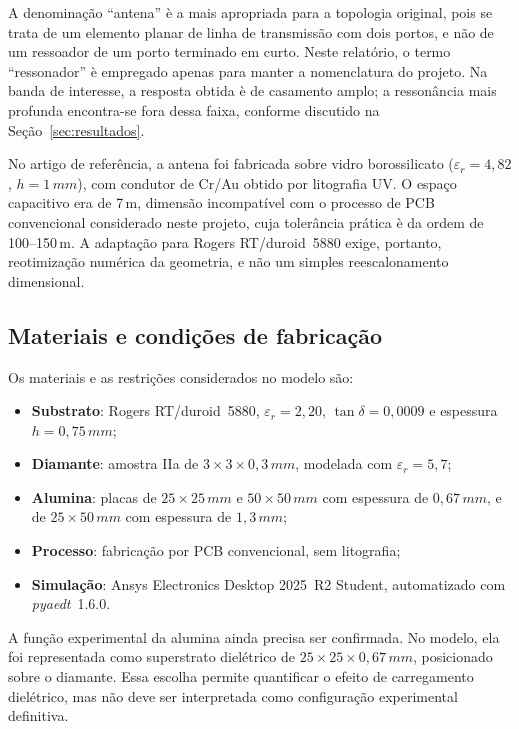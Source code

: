\documentclass[10pt,a4paper,twocolumn]{article}
\begin{document}
A denomina\c{c}\~ao ``antena'' \`e a mais apropriada para a topologia
original, pois se trata de um elemento planar de linha de transmiss\~ao
com dois portos, e n\~ao de um ressoador de um porto terminado em curto.
Neste relat\'orio, o termo ``ressonador'' \`e empregado apenas para
manter a nomenclatura do projeto. Na banda de interesse, a resposta
obtida \`e de casamento amplo; a resson\^ancia mais profunda encontra-se
fora dessa faixa, conforme discutido na Se\c{c}\~ao~\ref{sec:resultados}.

No artigo de refer\^encia, a antena foi fabricada sobre vidro
borossilicato ($\varepsilon_r=4,82$, $h=1\,mm$), com condutor de Cr/Au
obtido por litografia UV. O espa\c{c}o capacitivo era de
7\,\textmu m, dimens\~ao incompat\'ivel com o processo de PCB
convencional considerado neste projeto, cuja toler\^ancia pr\'atica \`e
da ordem de 100--150\,\textmu m. A adapta\c{c}\~ao para Rogers
RT/duroid~5880 exige, portanto, reotimiza\c{c}\~ao num\'erica da
geometria, e n\~ao um simples reescalonamento dimensional.

\subsection{Materiais e condi\c{c}\~oes de fabrica\c{c}\~ao}

Os materiais e as restri\c{c}\~oes considerados no modelo s\~ao:

\begin{itemize}
	\item \textbf{Substrato}: Rogers RT/duroid~5880,
	$\varepsilon_r=2,20$, $\tan\delta=0,0009$ e espessura
	$h=0,75\,mm$;
	\item \textbf{Diamante}: amostra IIa de
	$3\times3\times0,3\,mm$, modelada com $\varepsilon_r=5,7$;
	\item \textbf{Alumina}: placas de $25\times25\,mm$ e
	$50\times50\,mm$ com espessura de $0,67\,mm$, e de
	$25\times50\,mm$ com espessura de $1,3\,mm$;
	\item \textbf{Processo}: fabrica\c{c}\~ao por PCB convencional,
	sem litografia;
	\item \textbf{Simula\c{c}\~ao}: Ansys Electronics Desktop 2025~R2
	Student, automatizado com \emph{pyaedt}~1.6.0.
\end{itemize}

A fun\c{c}\~ao experimental da alumina ainda precisa ser confirmada.
No modelo, ela foi representada como superstrato diel\'etrico de
$25\times25\times0,67\,mm$, posicionado sobre o diamante. Essa escolha
permite quantificar o efeito de carregamento diel\'etrico, mas n\~ao
deve ser interpretada como configura\c{c}\~ao experimental definitiva.
\end{document}
